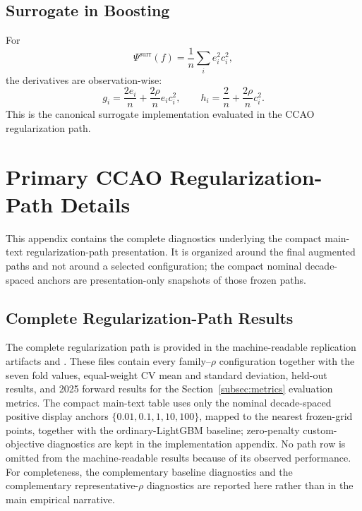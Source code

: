 \documentclass[10pt]{article}
\theoremstyle{definition}
\newcommand{\1}{\mathbf{1}}
\begin{document}
\subsection{Surrogate in Boosting}

For
\[
\Psi^{\mathrm{surr}}(f)
=
\frac{1}{n}\sum_i e_i^2c_i^2,
\]
the derivatives are observation-wise:
\[
g_i=\frac{2e_i}{n}+\frac{2\rho}{n}e_ic_i^2,
\qquad
h_i=\frac{2}{n}+\frac{2\rho}{n}c_i^2.
\]
This is the canonical surrogate implementation evaluated in the CCAO regularization path.


\section{Primary CCAO Regularization-Path Details}
\label{app:ccao_path_details}


This appendix contains the complete diagnostics underlying the compact main-text regularization-path presentation. It is organized around the final augmented paths and not around a selected configuration; the compact nominal decade-spaced anchors are presentation-only snapshots of those frozen paths.

\subsection{Complete Regularization-Path Results}


The complete regularization path is provided in the machine-readable replication
artifacts  and
. These files contain every family--$\rho$
configuration together with the seven fold values, equal-weight CV mean and
standard deviation, held-out results, and 2025 forward results for the
Section~\ref{subsec:metrics} evaluation metrics. 
The compact main-text table uses only the nominal decade-spaced positive display anchors $\{0.01,0.1,1,10,100\}$, mapped to the nearest frozen-grid points, together with the ordinary-LightGBM baseline; zero-penalty custom-objective diagnostics are kept in the implementation appendix. No path row is omitted from the machine-readable results because of its observed performance.
For completeness, the complementary baseline diagnostics and the complementary representative-$\rho$ diagnostics are reported here rather than in the main empirical narrative.
\end{document}
